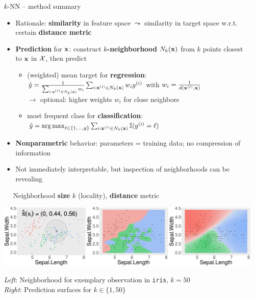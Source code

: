 \begin{frame}{$k$-NN -- method summary}

 
 

\medskip

\begin{itemize}
  \item Rationale: \textbf{similarity} in feature space $\leadsto$ similarity 
  in target space w.r.t. certain \textbf{distance metric}
  \item \textbf{Prediction} for $\mathbf{x}$: construct \textbf{$k$-neighborhood} 
  $N_k(\mathbf{x})$ from $k$ points closest to $\mathbf{x}$ in $\mathcal{X}$, then 
  predict
  \begin{itemize}
    \footnotesize
    \item (weighted) mean target for \textbf{regression}: 
    $\hat{y} = \tfrac{1}{\sum_{i: \mathbf{x}^{(i)} \in N_k(\mathbf{x})} w_i}  
    \sum_{i: \mathbf{x}^{(i)} \in N_k(\mathbf{x})} w_i y^{(i)} $ with $w_i = \tfrac{1}{d(\mathbf{x}^{(i)},\mathbf{x})}$\\
    $\rightarrow$ optional: higher weights $w_i$ for close neighbors
    \item most frequent class for \textbf{classification}: 
    $\hat{y} = \operatorname{arg\,max}_{\ell \in \{1, \ldots, g\}} \sum_{i: \mathbf{x}^{(i)} \in N_k(\mathbf{x})} \mathbb{I}(y^{(i)} = \ell)$
  \end{itemize}
  \item \textbf{Nonparametric} behavior: parameters = training data; no 
  compression of information
  \item Not immediately interpretable, but inspection of neighborhoods can be revealing
\end{itemize}

\medskip

 ~~ Neighborhood \textbf{size} $k$ (locality), 
\textbf{distance} metric

\vfill

\begin{minipage}{0.7\textwidth}
  \includegraphics[width=\textwidth]{figure/knn-neighborhood.pdf}
\end{minipage}%
\hfill
\begin{minipage}{0.25\textwidth}
  \tiny
  \raggedright
  \textit{Left}: Neighborhood for exemplary observation in \texttt{iris}, 
  $k = 50$ \\
  \textit{Right}: Prediction surfaces for $k \in \{1, 50\}$
\end{minipage}
\end{frame}

